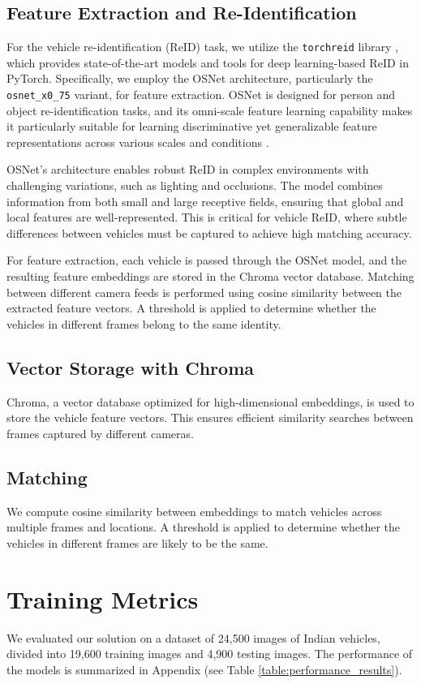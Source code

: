 \documentclass[11pt]{IEEEtran}
\begin{document}
\subsection{Feature Extraction and Re-Identification}
For the vehicle re-identification (ReID) task, we utilize the
\texttt{torchreid} library
\cite{torchreid}, which provides state-of-the-art models and tools for deep
learning-based ReID in PyTorch. Specifically, we employ the OSNet architecture,
particularly the \texttt{osnet\_x0\_75} variant, for feature extraction. OSNet
is
designed for person and object re-identification tasks, and its omni-scale
feature
learning capability makes it particularly suitable for learning discriminative
yet generalizable feature representations across various scales and conditions
\cite{zhou2019osnet, zhou2021osnet}.

OSNet's architecture enables robust ReID in complex environments with
challenging variations, such as lighting and occlusions. The model combines
information from both small and large receptive fields, ensuring that global
and local features are well-represented. This is critical for vehicle ReID,
where subtle differences between vehicles must be captured to achieve high
matching accuracy.

For feature extraction, each vehicle is passed through the OSNet model, and the
resulting feature embeddings are stored in the Chroma vector database.
Matching between different camera feeds is performed using cosine similarity
between the
extracted feature vectors. A threshold is applied to determine whether the
vehicles in different frames belong to the same identity.

\subsection{Vector Storage with Chroma}
Chroma, a vector database optimized for high-dimensional embeddings, is used to
store the vehicle feature vectors. This ensures efficient similarity searches
between frames captured by different cameras.

\subsection{Matching}
We compute cosine similarity between embeddings to match vehicles across
multiple frames and locations. A threshold is applied to determine whether the
vehicles in different frames are likely to be the same.

\section{Training Metrics}
We evaluated our solution on a dataset of 24,500 images of Indian vehicles,
divided into 19,600 training images and 4,900 testing images. The performance
of the models is summarized in Appendix (see Table
\ref{table:performance_results}).
\end{document}

